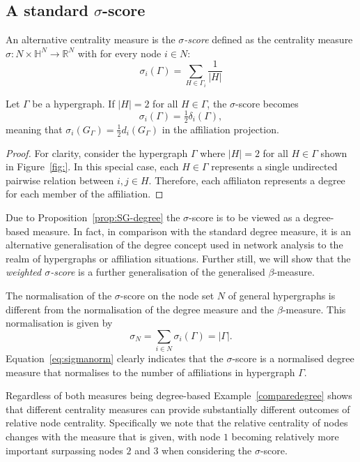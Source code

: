 \subsection{A standard $\sigma$-score}

An alternative centrality measure is the \emph{$\sigma$-score} defined as the centrality measure $\sigma \colon N \times \mathbb{H}^N \to \mathbb{R}^N$ with for every node $i \in N \colon$
\begin{equation}
\sigma_i (\Gamma ) = \sum_{H \in \Gamma_i} \frac{1}{|H|}
\end{equation}
\begin{proposition} \label{prop:SG-degree}
Let $\Gamma$ be a hypergraph. If $| H | = 2$ for all $H \in \Gamma$, the $\sigma$-score becomes
\begin{equation}
\sigma_i (\Gamma ) = \tfrac{1}{2} \delta_i ( \Gamma ) ,
\end{equation}
meaning that $\sigma_{i}(G_{\Gamma}) = \tfrac{1}{2} d_{i} (G_{\Gamma})$ in the affiliation projection.
\end{proposition}
\begin{proof}
For clarity, consider the hypergraph $\Gamma$ where $|H| = 2$ for all $H \in \Gamma$ shown in Figure~\ref{fig:}. In this special case, each $H \in \Gamma$ represents a single undirected pairwise relation between $i,j \in H$. Therefore, each affiliaton represents a degree for each member of the affiliation.
\end{proof}
Due to Proposition~\ref{prop:SG-degree} the $\sigma$-score is to be viewed as a degree-based measure. In fact, in comparison with the standard degree measure, it is an alternative generalisation of the degree concept used in network analysis to the realm of hypergraphs or affiliation situations. Further still, we will show that the \emph{weighted $\sigma$-score} is a further generalisation of the generalised $\beta$-measure.

The normalisation of the $\sigma$-score on the node set $N$ of general hypergraphs is different from the normalisation of the degree measure and the $\beta$-measure. This normalisation is given by
\begin{equation} \label{eq:sigmanorm}
\sigma_{N} = \sum_{i \in N} \sigma_i (\Gamma ) = | \Gamma | .
\end{equation}
Equation~\ref{eq:sigmanorm} clearly indicates that the $\sigma$-score is a normalised degree measure that normalises to the number of affiliations in hypergraph $\Gamma$.

Regardless of both measures being degree-based Example~\ref{comparedegree} shows that different centrality measures can provide substantially different outcomes of relative node centrality. Specifically we note that the relative centrality of nodes changes with the measure that is given, with node $1$ becoming relatively more important surpassing nodes $2$ and $3$ when considering the $\sigma$-score.

